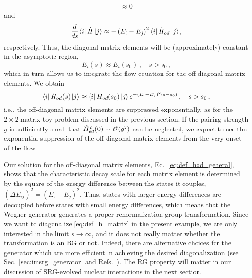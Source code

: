 {\begin{align}
  \approx0
\end{align}
and
\begin{align}
   \frac{d {}} {d {s}} \langle{i}|\,{\hat{H}}\,|{j}\rangle
  \approx-\left(E_i-E_j\right)^2\langle{i}|\,{\hat{H}_{od}}\,|{j}\rangle\,,
\end{align}
respectively. Thus, the diagonal matrix elements will be (approximately)
constant in the asymptotic region,
\begin{equation}
  E_i(s) \approx E_i(s_0)\,,\quad s>s_0\,,
\end{equation}
which in turn allows us to integrate the flow equation for the off-diagonal
matrix elements. We obtain
\begin{equation}\label{eq:def_hod_general}
  \matrixe{i}{\HO_{od}(s)}{j} \approx \matrixe{i}{\HO_{od}(s_0)}{j}\,e^{-(E_i-E_j)^2 (s-s_0)}\,, \quad s>s_0\,,
\end{equation}
i.e., the off-diagonal matrix elements are suppressed exponentially, as for the
$2\times2$ matrix toy problem discussed in the previous section. If the pairing
strength $g$ is sufficiently small that $\hat{H}^2_{od}(0)\sim \mathcal{O}(g^2)$ can 
be neglected, we expect to see the exponential suppression of the off-diagonal 
matrix elements from the very onset of the flow. 

Our solution for the off-diagonal matrix elements, Eq.~\eqref{eq:def_hod_general},
shows that the characteristic decay scale for each matrix element is determined 
by the square of the energy difference between the states it couples, 
$(\Delta E_{ij})^2 = (E_i-E_j)^2$. Thus, states with larger energy differences
are decoupled before states with small energy differences, which means that 
the Wegner generator generates a proper renormalization group transformation.
Since we want to diagonalize \eqref{eq:def_h_matrix} in the present example,
we are only interested in the limit $s\to\infty$, and it does not really matter
whether the transformation is an RG or not. Indeed, there are alternative choices
for the generator which are more efficient in achieving the desired diagonalization
(see Sec.~\ref{sec:imsrg_generator} and Refs.~\cite{Hergert:2016jk,Hergert:2017kx}).
The RG property will matter in our discussion of SRG-evolved nuclear interactions 
in the next section.

%
%
}
